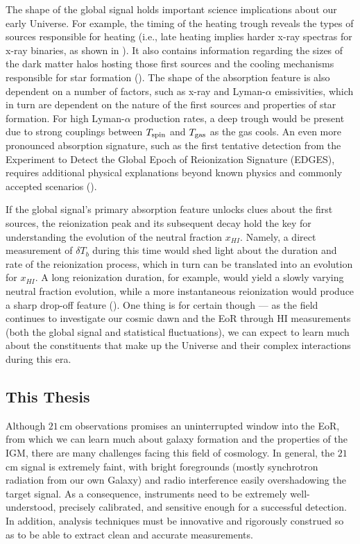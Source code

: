 The shape of the global signal holds important science implications about our early Universe. For example, the timing of the heating trough reveals the types of sources responsible for heating (i.e., late heating implies harder x-ray spectras for x-ray binaries, as shown in \citet{fialkov_et_al2014}). It also contains information regarding the sizes of the dark matter halos hosting those first sources and the cooling mechanisms responsible for star formation (\citealt{fialkov_et_al2014b}). The shape of the absorption feature is also dependent on a number of factors, such as x-ray and Lyman-$\alpha$ emissivities, which in turn are dependent on the nature of the first sources and properties of star formation. For high Lyman-$\alpha$ production rates, a deep trough would be present due to strong couplings between $T_{\rm spin}$ and $T_{\rm gas}$ as the gas cools. An even more pronounced absorption signature, such as the first tentative detection from the Experiment to Detect the Global Epoch of Reionization Signature (EDGES), requires additional physical explanations beyond known physics and commonly accepted scenarios (\citealt{bowman_et_al2018}). 

If the global signal's primary absorption feature unlocks clues about the first sources, the reionization peak and its subsequent decay hold the key for understanding the evolution of the neutral fraction $x_{HI}$. Namely, a direct measurement of $\delta T_{b}$ during this time would shed light about the duration and rate of the reionization process, which in turn can be translated into an evolution for $x_{HI}$. A long reionization duration, for example, would yield a slowly varying neutral fraction evolution, while a more instantaneous reionization would produce a sharp drop-off feature (\citealt{pritchard_and_loeb2010}). One thing is for certain though --- as the field continues to investigate our cosmic dawn and the EoR through HI measurements (both the global signal and statistical fluctuations), we can expect to learn much about the constituents that make up the Universe and their complex interactions during this era.

\subsection{This Thesis}

Although $21$\,cm observations promises an uninterrupted window into the EoR, from which we can learn much about galaxy formation and the properties of the IGM, there are many challenges facing this field of cosmology. In general, the $21$\,cm signal is extremely faint, with bright foregrounds (mostly synchrotron radiation from our own Galaxy) and radio interference easily overshadowing the target signal. As a consequence, instruments need to be extremely well-understood, precisely calibrated, and sensitive enough for a successful detection. In addition, analysis techniques must be innovative and rigorously construed so as to be able to extract clean and accurate measurements.

